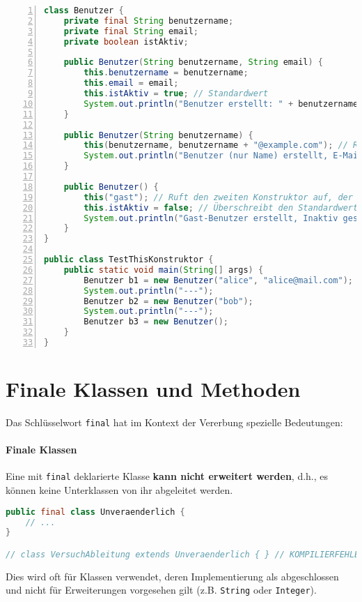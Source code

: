 \begin{lstlisting}[language=Java, caption={Aufruf eines anderen Konstruktors derselben Klasse via \texttt{this()}}, label=lst:this_konstruktor_beispiel, 
    basicstyle=\ttfamily\footnotesize, breaklines=true, frame=tb, numbers=left]
class Benutzer {
    private final String benutzername;
    private final String email;
    private boolean istAktiv;

    public Benutzer(String benutzername, String email) {
        this.benutzername = benutzername;
        this.email = email;
        this.istAktiv = true; // Standardwert
        System.out.println("Benutzer erstellt: " + benutzername + ", Aktiv: " + istAktiv);
    }

    public Benutzer(String benutzername) {
        this(benutzername, benutzername + "@example.com"); // Ruft den ersten Konstruktor auf
        System.out.println("Benutzer (nur Name) erstellt, E-Mail generiert.");
    }
    
    public Benutzer() {
        this("gast"); // Ruft den zweiten Konstruktor auf, der dann den ersten aufruft
        this.istAktiv = false; // Überschreibt den Standardwert für Gast-Benutzer
        System.out.println("Gast-Benutzer erstellt, Inaktiv gesetzt.");
    }
}

public class TestThisKonstruktor {
    public static void main(String[] args) {
        Benutzer b1 = new Benutzer("alice", "alice@mail.com");
        System.out.println("---");
        Benutzer b2 = new Benutzer("bob");
        System.out.println("---");
        Benutzer b3 = new Benutzer();
    }
}
\end{lstlisting}

\section{Finale Klassen und Methoden}
\label{sec:final}

Das Schlüsselwort \texttt{final} hat im Kontext der Vererbung spezielle Bedeutungen:

\paragraph{Finale Klassen}
Eine mit \texttt{final} deklarierte Klasse \textbf{kann nicht erweitert werden}, d.h., es können keine Unterklassen von ihr abgeleitet werden.
\begin{lstlisting}[language=Java, caption={\texttt{final} Klasse}, label=lst:final_klasse, basicstyle=\ttfamily\footnotesize, breaklines=true, frame=tb]
public final class Unveraenderlich {
    // ...
}

// class VersuchAbleitung extends Unveraenderlich { } // KOMPILIERFEHLER!
\end{lstlisting}
Dies wird oft für Klassen verwendet, deren Implementierung als abgeschlossen und nicht für Erweiterungen vorgesehen gilt (z.B. \texttt{String} oder \texttt{Integer}).

